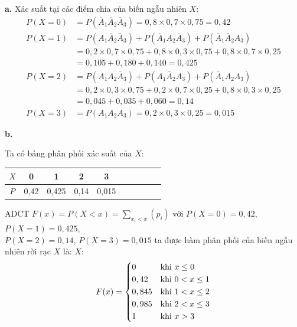 \documentclass[12pt]{article}
\begin{document}
\begin{itemize}
    \textbf{a.}
    Xác suất tại các điểm chia của biến ngẫu nhiên $X$:
    \begin{align*}
        P(X = 0) &= P(\overline{A}_1 \overline{A}_2 \overline{A}_3) = 0,8 \times 0,7 \times 0,75 = 0,42 \\
        P(X = 1) &= P(A_1 \overline{A}_2 \overline{A}_3) + P(\overline{A}_1 A_2 \overline{A}_3) + P(\overline{A}_1 \overline{A}_2 A_3) \\
        &= 0,2 \times 0,7 \times 0,75 + 0,8 \times 0,3 \times 0,75 + 0,8 \times 0,7 \times 0,25 \\
        &= 0,105 + 0,180 + 0,140 = 0,425 \\
        P(X = 2) &= P(A_1 A_2 \overline{A}_3) + P(A_1 \overline{A}_2 A_3) + P(\overline{A}_1 A_2 A_3) \\
        &= 0,2 \times 0,3 \times 0,75 + 0,2 \times 0,7 \times 0,25 + 0,8 \times 0,3 \times 0,25 \\
        &= 0,045 + 0,035 + 0,060 = 0,14 \\
        P(X = 3) &= P(A_1 A_2 A_3) = 0,2 \times 0,3 \times 0,25 = 0,015
    \end{align*}

    \clearpage

    \textbf{b.}
    
    Ta có bảng phân phối xác suất của $X$:
    \begin{center}
        \begin{tabular}{|Sc|Sc|Sc|Sc|Sc|}
            \hline
            $X$ & 0 & 1 & 2 & 3 \\
            \hline
            $P$ & 0,42 & 0,425 & 0,14 & 0,015 \\
            \hline
        \end{tabular}
    \end{center}
    
    ADCT $\displaystyle F(x) = P(X < x) = \sum_{x_i < x} (p_i)$ với $P(X=0)=0,42$, $P(X=1)=0,425$, \\$P(X=2)=0,14$, $P(X=3)=0,015$ ta được hàm phân phối của biến ngẫu nhiên rời rạc $X$ là: $X$:
    \[ F(x) = \begin{dcases} 
        0 & \text{khi } x \le 0 \\ 
        0,42 & \text{khi } 0 < x \le 1 \\ 
        0,845 & \text{khi } 1 < x \le 2 \\ 
        0,985 & \text{khi } 2 < x \le 3 \\
        1 & \text{khi } x > 3
    \end{dcases} \]
    

\end{itemize}
\end{document}
